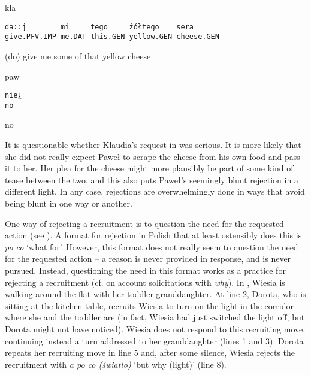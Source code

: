 \documentclass[output=paper]{langsci/langscibook}
\begin{document}
\vspace{2mm}
%
%
\begin{mdframednoverticalspace}[style=firstfoc]
\begin{transbox}{2}{kla}
\begin{verbatim}
da::j        mi     tego     żółtego    sera
give.PFV.IMP me.DAT this.GEN yellow.GEN cheese.GEN
\end{verbatim}
(do) give me some of that yellow cheese
\end{transbox}
\end{mdframednoverticalspace}
%
\begin{mdframednoverticalspace}[style=secondfoc]
\begin{transbox}{3}{paw}
\begin{verbatim}
nie¿
no
\end{verbatim}
no
\end{transbox}
\end{mdframednoverticalspace}
%

It is questionable whether Klaudia’s request in  was serious. It is more likely that she did not really expect Paweł to scrape the cheese from his own food and pass it to her.  Her plea for the cheese might more plausibly be part of some kind of tease between the two, and this also puts Paweł’s seemingly blunt rejection in a different light.  In any case, rejections are overwhelmingly done in ways that avoid being blunt in one way or another.

One way of rejecting a recruitment is to question the need for the requested action (see \citealt{ZinkenOgiermann2011}).  A format for rejection in Polish that at least ostensibly does this is \textit{po co} `what for'.  However, this format does not really seem to question the need for the requested action -- a reason is never provided in response, and is never pursued.  Instead, questioning the need in this format works as a practice for rejecting a recruitment (cf. \citealt{BoldenRobinson2011} on account solicitations with \textit{why}).  In  , Wiesia is walking around the flat with her toddler granddaughter.  At line 2, Dorota, who is sitting at the kitchen table, recruits Wiesia to turn on the light in the corridor where she and the toddler are (in fact, Wiesia had just switched the light off, but Dorota might not have noticed).  Wiesia does not respond to this recruiting move, continuing instead a turn addressed to her granddaughter (lines 1 and 3).  Dorota repeats her recruiting move in line 5 and, after some silence, Wiesia rejects the recruitment with \textit{a po co (światło)} ‘but why (light)’ (line 8).
\end{document}
